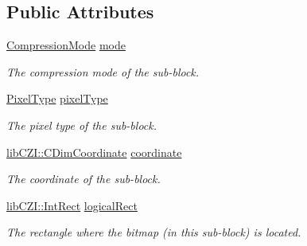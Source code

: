 \subsection*{Public Attributes}
\begin{DoxyCompactItemize}
\item 
\mbox{\label{structlib_c_z_i_1_1_sub_block_info_a0e293a3e7ea6188e3df08ae74c16221f}} 
\hyperlink{namespacelib_c_z_i_a672959aa909ce27c5a549465200b08fb}{Compression\+Mode} \hyperlink{structlib_c_z_i_1_1_sub_block_info_a0e293a3e7ea6188e3df08ae74c16221f}{mode}
\begin{DoxyCompactList}\small\item\em The compression mode of the sub-\/block. \end{DoxyCompactList}\item 
\mbox{\label{structlib_c_z_i_1_1_sub_block_info_a278ea0802b23ed941cae5f0dbf5dc52c}} 
\hyperlink{namespacelib_c_z_i_abf8ce12ab88b06c8b3b47efbb5e2e834}{Pixel\+Type} \hyperlink{structlib_c_z_i_1_1_sub_block_info_a278ea0802b23ed941cae5f0dbf5dc52c}{pixel\+Type}
\begin{DoxyCompactList}\small\item\em The pixel type of the sub-\/block. \end{DoxyCompactList}\item 
\mbox{\label{structlib_c_z_i_1_1_sub_block_info_ae4acf2922fe594327d1c6fbfb2062781}} 
\hyperlink{classlib_c_z_i_1_1_c_dim_coordinate}{lib\+C\+Z\+I\+::\+C\+Dim\+Coordinate} \hyperlink{structlib_c_z_i_1_1_sub_block_info_ae4acf2922fe594327d1c6fbfb2062781}{coordinate}
\begin{DoxyCompactList}\small\item\em The coordinate of the sub-\/block. \end{DoxyCompactList}\item 
\mbox{\label{structlib_c_z_i_1_1_sub_block_info_acca674e34ebccc46b43ee6a429c14eda}} 
\hyperlink{structlib_c_z_i_1_1_int_rect}{lib\+C\+Z\+I\+::\+Int\+Rect} \hyperlink{structlib_c_z_i_1_1_sub_block_info_acca674e34ebccc46b43ee6a429c14eda}{logical\+Rect}
\begin{DoxyCompactList}\small\item\em The rectangle where the bitmap (in this sub-\/block) is located. \end{DoxyCompactList}\item 

\end{DoxyCompactItemize}
